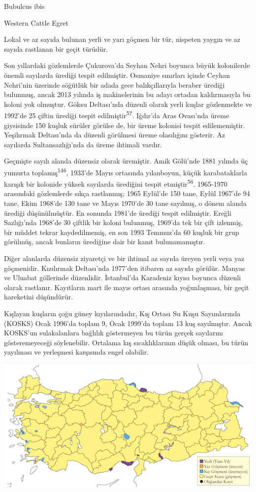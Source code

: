 \documentclass[
  letterpaper,
  DIV=11,
  numbers=noendperiod]{scrreprt}
\begin{document}
Bubulcus ibis

Western Cattle Egret

Lokal ve az sayıda bulunan yerli ve yarı göçmen bir tür, nispeten yaygın
ve az sayıda rastlanan bir geçit türüdür.

Son yıllardaki gözlemlerde Çukurova'da Seyhan Nehri boyunca büyük
kolonilerde önemli sayılarda ürediği tespit edilmiştir. Osmaniye
sınırları içinde Ceyhan Nehri'nin üzerinde söğütlük bir adada gece
balıkçıllarıyla beraber ürediği bulunmuş, ancak 2013 yılında iş
makinelerinin bu adayı ortadan kaldırmasıyla bu koloni yok olmuştur.
Göksu Deltası'nda düzenli olarak yerli kuşlar gözlenmekte ve 1992'de 25
çiftin ürediği tespit edilmiştir\textsuperscript{57}. Iğdır'da Aras
Ovası'nda üreme giysisinde 150 kuşluk sürüler görülse de, bir üreme
kolonisi tespit edilememiştir. Yeşilırmak Deltası'nda da düzenli
görülmesi üreme olasılığını gösterir. Az sayılarda Sultansazlığı'nda da
üreme ihtimali vardır.

Geçmişte sayılı alanda düzensiz olarak üremiştir. Amik Gölü'nde 1881
yılında üç yumurta toplamış\textsuperscript{146}, 1933'de Mayıs
ortasında yılanboyun, küçük karabataklarla karışık bir kolonide yüksek
sayılarda ürediğini tespit etmiştir\textsuperscript{56}. 1965-1970
arasındaki gözlemlerde sıkça rastlanmış; 1965 Eylül'de 150 tane, Eylül
1967'de 94 tane, Ekim 1968'de 130 tane ve Mayıs 1970'de 30 tane
sayılmış, o dönem alanda ürediği düşünülmüştür. En sonunda 1981'de
ürediği tespit edilmiştir. Ereğli Sazlığı'nda 1968'de 30 çiftlik bir
koloni bulunmuş, 1969'da tek bir çift izlenmiş, bir müddet tekrar
kaydedilmemiş, en son 1993 Temmuz'da 60 kuşluk bir grup görülmüş, ancak
bunların ürediğine dair bir kanıt bulunamamıştır.

Diğer alanlarda düzensiz ziyaretçi ve bir ihtimal az sayıda üreyen yerli
veya yaz göçmenidir. Kızılırmak Deltası'nda 1977'den itibaren az sayıda
görülür. Manyas ve Uluabat göllerinde düzenlidir. İstanbul'da Karadeniz
kıyısı boyunca düzenli olarak rastlanır. Kayıtların mart ile mayıs
ortası arasında yoğunlaşması, bir geçit hareketini düşündürür.

Kışlayan kuşların çoğu güney kıyılarındadır, Kış Ortası Su Kuşu
Sayımlarında (KOSKS) Ocak 1996'da toplam 9, Ocak 1999'da toplam 13 kuş
sayılmıştır. Ancak KOSKS'un sulakalanlara bağlılık göstermeyen bu türün
gerçek sayılarını gösteremeyeceği söylenebilir. Ortalama kış
sıcaklıklarının düşük olması, bu türün yayılması ve yerleşmesi
karşısında engel olabilir.

\includegraphics{images/harita_Page_068.png}
\end{document}
